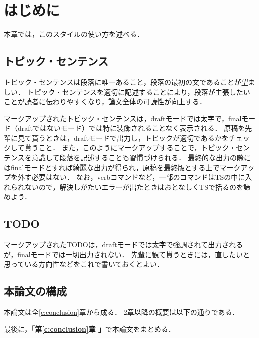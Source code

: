 
\chapter{はじめに}
\label{c:introduction}

本章では，このスタイルの使い方を述べる．

\section{トピック・センテンス}

トピック・センテンスは段落に唯一あること，段落の最初の文であることが望ましい．
トピック・センテンスを適切に記述することにより，段落が主張したいことが読者に伝わりやすくなり，論文全体の可読性が向上する．

マークアップされたトピック・センテンスは，draftモードでは太字で，finalモード（draftではないモード）では特に装飾されることなく表示される．
原稿を先輩に見て貰うときは，draftモードで出力し，トピックが適切であるかをチェックして貰うこと．
また，このようにマークアップすることで，トピック・センテンスを意識して段落を記述することも習慣づけられる．
最終的な出力の際にはfinalモードとすれば綺麗な出力が得られ，原稿を最終版とする上でマークアップを外す必要はない．
なお，verbコマンドなど，一部のコマンドはTSの中に入れられないので，解決しがたいエラーが出たときはおとなしくTSで括るのを諦めよう．

\section{TODO}

マークアップされたTODOは，draftモードでは太字で強調されて出力されるが，finalモードでは一切出力されない．
先輩に観て貰うときには，直したいと思っている方向性などをこれで書いておくとよい．

\section{本論文の構成}
本論文は全\ref{c:conclusion}章から成る．
2章以降の概要は以下の通りである．


最後に，{\bf 「第\ref{c:conclusion}章 」}で本論文をまとめる．
